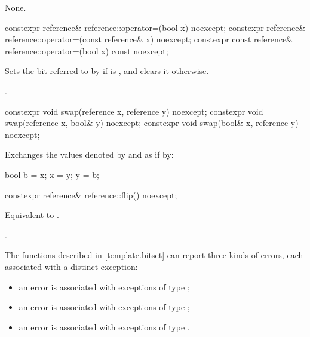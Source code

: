 \begin{itemdescr}
\pnum
\effects
None.
\end{itemdescr}

%
\begin{itemdecl}
constexpr reference& reference::operator=(bool x) noexcept;
constexpr reference& reference::operator=(const reference& x) noexcept;
constexpr const reference& reference::operator=(bool x) const noexcept;
\end{itemdecl}

\begin{itemdescr}
\pnum
\effects
Sets the bit referred to by  if  is ,
and clears it otherwise.

\pnum
\returns
{}.
\end{itemdescr}

%
\begin{itemdecl}
constexpr void swap(reference x, reference y) noexcept;
constexpr void swap(reference x, bool& y) noexcept;
constexpr void swap(bool& x, reference y) noexcept;
\end{itemdecl}

\begin{itemdescr}
\pnum
\effects
Exchanges the values denoted by  and  as if by:

\begin{codeblock}
bool b = x;
x = y;
y = b;
\end{codeblock}
\end{itemdescr}

%
\begin{itemdecl}
constexpr reference& reference::flip() noexcept;
\end{itemdecl}

\begin{itemdescr}
\pnum
\effects
Equivalent to .

\pnum
\returns
{}.
\end{itemdescr}

\pnum
The functions described in \ref{template.bitset} can report three kinds of
errors, each associated with a distinct exception:
\begin{itemize}
\item
an
error is associated with exceptions of type
;
%
\item
an
error is associated with exceptions of type
;
%
\item
an
error is associated with exceptions of type
.
%
\end{itemize}

